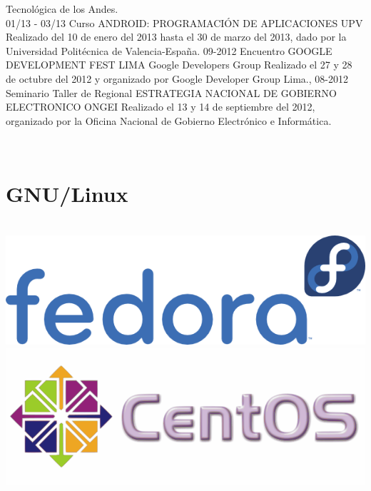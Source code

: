 \documentclass[]{friggeri-cv}
\begin{document}
\begin{entrylist}
{    Tecnol\'ogica de los Andes.\\}
    \entry
    {01/13 - 03/13}
    {Curso ANDROID{:} PROGRAMACI\'ON DE APLICACIONES}
    {UPV}
    {Realizado del 10 de enero del 2013 hasta el 30 de marzo del 2013, dado por
    la Universidad Polit\'ecnica de Valencia-Espa\~na.}
    \entry
    {09-2012}
    {Encuentro GOOGLE DEVELOPMENT FEST LIMA}
    {Google Developers Group}
    {Realizado el 27 y 28 de octubre del 2012 y organizado por Google Developer Group Lima.},
    \entry
    {08-2012}
    {Seminario Taller de Regional ESTRATEGIA NACIONAL DE GOBIERNO ELECTRONICO}
    {ONGEI}
    {Realizado el 13 y 14 de septiembre del 2012, organizado por la Oficina
    Nacional de Gobierno Electr\'onico e Inform\'atica.}
\end{entrylist}
\begin{aside}
    ~
    \section{GNU/Linux}
    ~
    \includegraphics[scale=0.12]{img/fedora}
    \includegraphics[scale=0.12]{img/centos}
    ~
\end{aside}

\newpage
\end{document}
